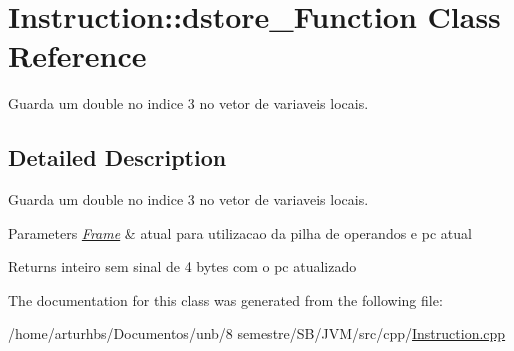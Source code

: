 \hypertarget{classInstruction_1_1dstore__3Function}{}\section{Instruction\+:\+:dstore\+\_\+Function Class Reference}
\label{classInstruction_1_1dstore__3Function}


Guarda um double no indice 3 no vetor de variaveis locais.  




\subsection{Detailed Description}
Guarda um double no indice 3 no vetor de variaveis locais. 


\begin{DoxyParams}{Parameters}
{\em \hyperlink{classFrame}{Frame}} & atual para utilizacao da pilha de operandos e pc atual \\
\hline
\end{DoxyParams}
\begin{DoxyReturn}{Returns}
inteiro sem sinal de 4 bytes com o pc atualizado 
\end{DoxyReturn}


The documentation for this class was generated from the following file\+:\begin{DoxyCompactItemize}
\item 
/home/arturhbs/\+Documentos/unb/8 semestre/\+S\+B/\+J\+V\+M/src/cpp/\hyperlink{Instruction_8cpp}{Instruction.\+cpp}\end{DoxyCompactItemize}
